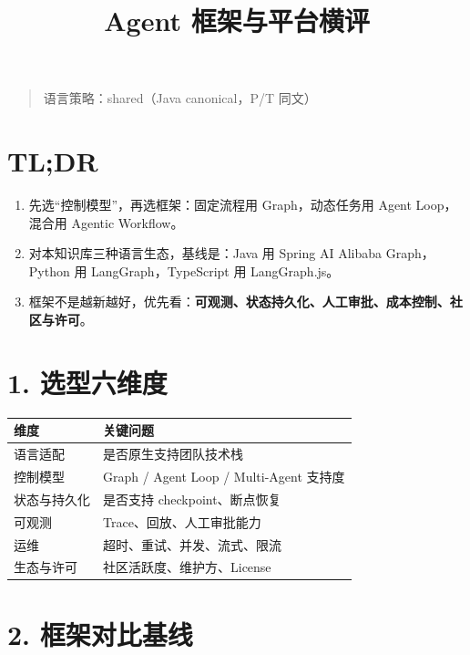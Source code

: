 \documentclass[9pt,a4paper,twocolumn]{ctexart}
\begin{document}
\title{Agent 框架与平台横评}
\date{}
\maketitle
{}

\begin{quote}
语言策略：shared（Java canonical，P/T 同文）
\end{quote}



\section*{TL;DR}

\begin{enumerate}[itemsep=1pt, topsep=2pt]
  \item 先选“控制模型”，再选框架：固定流程用 Graph，动态任务用 Agent Loop，混合用 Agentic Workflow。
  \item 对本知识库三种语言生态，基线是：Java 用 Spring AI Alibaba Graph，Python 用 LangGraph，TypeScript 用 LangGraph.js。
  \item 框架不是越新越好，优先看：\textbf{可观测、状态持久化、人工审批、成本控制、社区与许可}。
\end{enumerate}


\section*{1. 选型六维度}

{\footnotesize
\begin{tabular}{|p{}|p{}|}
\hline
\textbf{维度} & \textbf{关键问题} \\
\hline
语言适配 & 是否原生支持团队技术栈 \\
\hline
控制模型 & Graph / Agent Loop / Multi-Agent 支持度 \\
\hline
状态与持久化 & 是否支持 checkpoint、断点恢复 \\
\hline
可观测 & Trace、回放、人工审批能力 \\
\hline
运维 & 超时、重试、并发、流式、限流 \\
\hline
生态与许可 & 社区活跃度、维护方、License \\
\hline
\end{tabular}
}



\section*{2. 框架对比基线}
\end{document}
